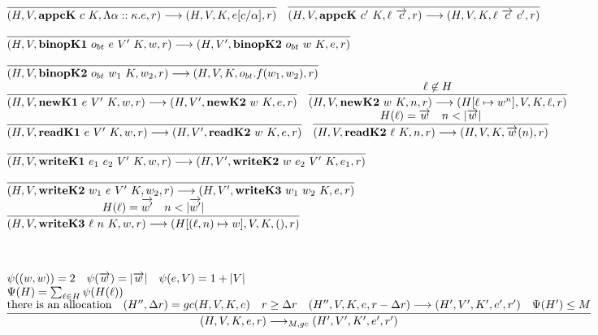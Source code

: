 \documentclass[fleqn]{article}
\begin{document}
\[\begin{array}{l}
	\infer{(H,V,\mathbf{appcK}~c~K,\Lambda \alpha::\kappa. e, r) \longrightarrow (H,V,K,e[c/\alpha],r)}{\vspace{1em}} \hspace{1em}
	\infer{(H,V,\mathbf{appcK}~c'~K,\ell~\overrightarrow{c},r) \longrightarrow (H,V,K,\ell~\overrightarrow{c}~c',r)}{\vspace{1em}} \\
	\infer{(H,V,\mathbf{binopK1}~o_{bt}~e~V'~K,w,r) \longrightarrow (H,V',\mathbf{binopK2}~o_{bt}~w~K,e,r)}{\vspace{1em}}	\\
	\infer{(H,V,\mathbf{binopK2}~o_{bt}~w_1~K,w_2,r) \longrightarrow (H,V,K,o_{bt}.f(w_1,w_2),r)}{\vspace{1em}} \\
	\infer{(H,V,\mathbf{newK1}~e~V'~K,w,r) \longrightarrow (H,V',\mathbf{newK2}~w~K,e,r)}{\vspace{1em}} \hspace{1em}
	\infer{(H,V,\mathbf{newK2}~w~K,n,r) \longrightarrow (H[\ell \mapsto w^n],V,K,\ell,r)}{\ell \not\in H} \\
	\infer{(H,V,\mathbf{readK1}~e~V'~K,w,r) \longrightarrow (H,V',\mathbf{readK2}~w~K,e,r)}{\vspace{1em}} \hspace{1em}
	\infer{(H,V,\mathbf{readK2}~\ell~K,n,r) \longrightarrow (H,V,K,\overrightarrow{w}(n),r)}{H(\ell) = \overrightarrow{w} & n < |\overrightarrow{w}|} \\
	\infer{(H,V,\mathbf{writeK1}~e_1~e_2~V'~K,w,r) \longrightarrow (H,V',\mathbf{writeK2}~w~e_2~V'~K,e_1,r)}{\vspace{1em}} \\
	\infer{(H,V,\mathbf{writeK2}~w_1~e~V'~K,w_2,r) \longrightarrow (H,V',\mathbf{writeK3}~w_1~w_2~K,e,r)}{\vspace{1em}} \\
	\infer{(H,V,\mathbf{writeK3}~\ell~n~K,w,r) \longrightarrow (H[(\ell,n) \mapsto w],V,K,(),r)}{H(\ell) = \overrightarrow{w'} & n < |\overrightarrow{w'}|} \\
	\\
	\\
	\\
	\psi((w,w)) = 2 \hspace{1em} \psi(\overrightarrow{w}) = |\overrightarrow{w}| \hspace{1em} \psi(e,V)=1+|V| \\
	\Psi(H) = \sum_{\ell \in H} \psi(H(\ell)) \\
	\infer{(H,V,K,e,r) \longrightarrow_{M,gc} (H',V',K',e',r')}{\mathrm{there~is~an~allocation} & (H'',\Delta r) = gc(H,V,K,e) & r \ge \Delta r & (H'',V,K,e,r-\Delta r) \longrightarrow (H',V',K',e',r') & \Psi(H') \le M} \\

\end{array}\]
\end{document}
